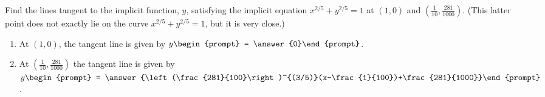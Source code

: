 \documentclass{ximera}
\author{Gregory Hartman \and Matthew Carr}
\begin{document}
\begin{exercise}




Find the lines tangent to the implicit function, $y$, satisfying the implicit equation $x^{2/5}+y^{2/5}=1$ at $(1,0)$ and $\left(\frac{1}{10},\frac{281}{1000}\right)$. (This latter point does not exactly lie on the curve $x^{2/5}+y^{2/5}=1$, but it is very close.)
\begin{enumerate}
\item At $(1,0)$, the tangent line is given by $y\begin{prompt} = \answer{0}\end{prompt}$.
\item At $\left(\frac{1}{10},\frac{281}{1000}\right)$ the tangent line is given by $y\begin{prompt} = \answer{\left(\frac{281}{100}\right)^{(3/5)}(x-\frac{1}{100})+\frac{281}{1000}}\end{prompt}$.
\end{enumerate}
\end{exercise}
\end{document}
